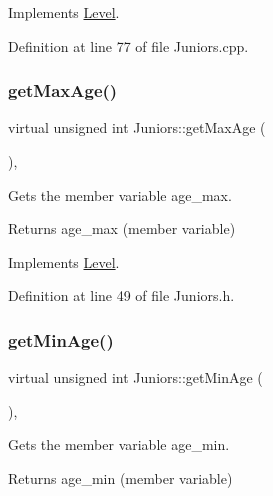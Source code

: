Implements \hyperlink{class_level_ac118b390f16a75b9a0e9df198b3190ad}{Level}.



Definition at line 77 of file Juniors.\+cpp.

\hypertarget{class_juniors_a98c28047a2d5ff2b14651ee9eccfd2b6}{}\label{class_juniors_a98c28047a2d5ff2b14651ee9eccfd2b6} 
\subsubsection{\texorpdfstring{get\+Max\+Age()}{getMaxAge()}}
{\footnotesize\ttfamily virtual unsigned int Juniors\+::get\+Max\+Age (\begin{DoxyParamCaption}{ }\end{DoxyParamCaption})\hspace{0.3cm}{\ttfamily [inline]}, {\ttfamily [virtual]}}



Gets the member variable age\+\_\+max. 

\begin{DoxyReturn}{Returns}
age\+\_\+max (member variable) 
\end{DoxyReturn}


Implements \hyperlink{class_level_ae7b28ba0cb8d49372c4657fbe42706e1}{Level}.



Definition at line 49 of file Juniors.\+h.

\hypertarget{class_juniors_a3110bdbaa344b2bfefa2ddcb8be8d7c6}{}\label{class_juniors_a3110bdbaa344b2bfefa2ddcb8be8d7c6} 
\subsubsection{\texorpdfstring{get\+Min\+Age()}{getMinAge()}}
{\footnotesize\ttfamily virtual unsigned int Juniors\+::get\+Min\+Age (\begin{DoxyParamCaption}{ }\end{DoxyParamCaption})\hspace{0.3cm}{\ttfamily [inline]}, {\ttfamily [virtual]}}



Gets the member variable age\+\_\+min. 

\begin{DoxyReturn}{Returns}
age\+\_\+min (member variable) 
\end{DoxyReturn}


